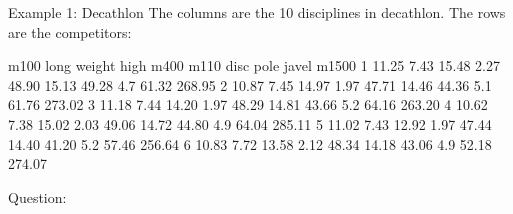 \documentclass[11pt,handout,aspectratio=169]{beamer}
\begin{document}
\begin{frame}[fragile]{Example 1: Decathlon}
The columns are the 10 disciplines in decathlon. The rows are the competitors:
\scriptsize
\begin{Schunk}
\begin{Soutput}
   m100 long weight high  m400  m110  disc pole javel  m1500
1 11.25 7.43  15.48 2.27 48.90 15.13 49.28  4.7 61.32 268.95
2 10.87 7.45  14.97 1.97 47.71 14.46 44.36  5.1 61.76 273.02
3 11.18 7.44  14.20 1.97 48.29 14.81 43.66  5.2 64.16 263.20
4 10.62 7.38  15.02 2.03 49.06 14.72 44.80  4.9 64.04 285.11
5 11.02 7.43  12.92 1.97 47.44 14.40 41.20  5.2 57.46 256.64
6 10.83 7.72  13.58 2.12 48.34 14.18 43.06  4.9 52.18 274.07
\end{Soutput}
\end{Schunk}
Question: 
\end{frame}


\end{document}
